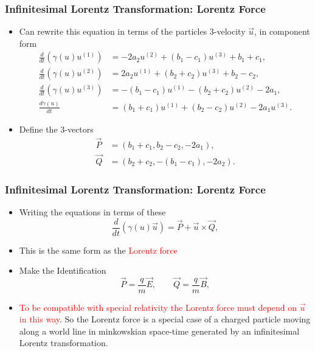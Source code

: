 \documentclass[10pt,a4paper]{beamer}
\begin{document}
\begin{frame}
\frametitle{Infinitesimal Lorentz Transformation: Lorentz Force}
\begin{itemize}
\item<1->{Can rewrite this equation in terms of the particles $3$-velocity $\vec{u}$, in component form
\begin{align*}
\frac{d}{dt} (\gamma(u) u^{(1)}) & = -2a_2u^{(2)} + (b_1 - c_1)u^{(3)} + b_1 + c_1, \\ 
\frac{d}{dt} (\gamma(u) u^{(2)}) & = 2a_2 u^{(1)} + (b_2 + c_2) u^{(3)} + b_2 - c_2,\\ 
\frac{d}{dt} (\gamma(u) u^{(3)}) & = -(b_1 - c_1) u^{(1)} - (b_2 + c_2 )u^{(2)} - 2a_1,\\ 
\frac{d\gamma(u)}{dt} & = (b_1 + c_1)u^{(1)} + (b_2 - c_2) u^{(2)} - 2a_1 u^{(3)}.
\end{align*}}
\item<2->{Define the $3$-vectors
\begin{align*}
\vec{P} & = (b_1+c_1,b_2-c_2,-2a_1), \\
\vec{Q} & = (b_2 + c_2, -(b_1 - c_1),-2a_2).
\end{align*}}

\end{itemize}

\end{frame}

\begin{frame}
\frametitle{Infinitesimal Lorentz Transformation: Lorentz Force}
\begin{itemize}
\item<1->{Writing the equations in terms of these 
\begin{equation*}
\frac{d}{dt} (\gamma(u)\vec{u}) = \vec{P} + \vec{u} \times \vec{Q},
\end{equation*}}
\item<2->{This is the same form as the \textcolor{red}{Lorentz force}}
\item<3->{Make the Identification
\begin{equation}
\vec{P} = \frac{q}{m} \vec{E}, \qquad \vec{Q} = \frac{q}{m}\vec{B},
\end{equation}}
\item<3->{\textcolor{red}{To be compatible with special relativity the Lorentz force must depend on $\vec{u}$ in this way}. So the Lorentz force is a special case of a charged particle moving along a world line in minkowskian space-time generated by an infinitesimal Lorentz transformation.}
\end{itemize}

\end{frame}
\end{document}
